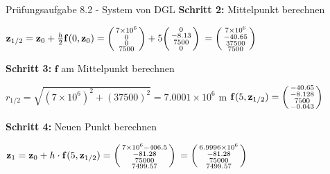 \begin{example2}{Prüfungsaufgabe 8.2 - System von DGL}
\textbf{Schritt 2:} Mittelpunkt berechnen

$\mathbf{z}_{1/2} = \mathbf{z}_0 + \frac{h}{2} \mathbf{f}(0, \mathbf{z}_0) = \begin{psmallmatrix} 7 \times 10^6 \\ 0 \\ 0 \\ 7500 \end{psmallmatrix} + 5 \begin{psmallmatrix} 0 \\ -8.13 \\ 7500 \\ 0 \end{psmallmatrix}$
$= \begin{psmallmatrix} 7 \times 10^6 \\ -40.65 \\ 37500 \\ 7500 \end{psmallmatrix}$

\textbf{Schritt 3:} $\mathbf{f}$ am Mittelpunkt berechnen

$r_{1/2} = \sqrt{(7 \times 10^6)^2 + (37500)^2} = 7.0001 \times 10^6$ m
$\mathbf{f}(5, \mathbf{z}_{1/2}) = \begin{psmallmatrix} -40.65 \\ -8.128 \\ 7500 \\ -0.043 \end{psmallmatrix}$

\textbf{Schritt 4:} Neuen Punkt berechnen

$\mathbf{z}_1 = \mathbf{z}_0 + h \cdot \mathbf{f}(5, \mathbf{z}_{1/2}) = \begin{psmallmatrix} 7 \times 10^6 - 406.5 \\ -81.28 \\ 75000 \\ 7499.57 \end{psmallmatrix}$
$= \begin{psmallmatrix} 6.9996 \times 10^6 \\ -81.28 \\ 75000 \\ 7499.57 \end{psmallmatrix}$


\end{example2}
